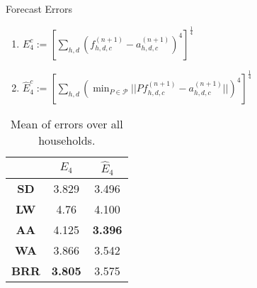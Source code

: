 \documentclass[notes]{beamer}
\begin{document}
\begin{frame}{Forecast Errors}
\begin{enumerate}
\item $E_4^c := \left[ \displaystyle \sum_{h,d} \left(f^{(n+1)}_{h,d,c} - a^{(n+1)}_{h,d,c} \right)^4 \right]^\frac{1}{4} $
\pause
\item $\hat{E}_{4}^c := \displaystyle \left[ \sum_{h,d} \left(\min_{P \in \mathscr{P}} || Pf_{h,d,c}^{(n+1)} - a_{h,d,c}^{(n+1)} || \right)^4 \right]^{\frac{1}{4}}$
\pause
\end{enumerate}


\begin{table}
\centering
\begin{tabular}{|c|c|c|}
\hline
 & $E_4$ & $\hat{E}_4$ \\
 \hline
\textbf{SD} & 3.829 & 3.496 \\
\textbf{LW} & 4.76 & 4.100 \\ 
\textbf{AA} & 4.125 & \textbf{3.396} \\ 
\textbf{WA} & 3.866 & 3.542 \\ 
\textbf{BRR} & \textbf{3.805} & 3.575 \\
\hline
\end{tabular}
\caption{Mean of errors over all households.}
\label{tab:errs}
\end{table}

\end{frame}



\end{document}
